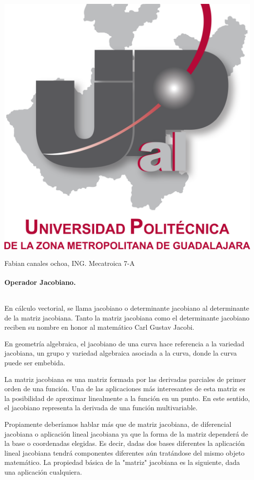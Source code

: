 \documentclass[10pt,a4paper]{article}
\begin{document}
\begin{center}
\includegraphics[scale=0.2]{imagenes/upzmg.png} 
\end{center}
\large \huge Fabian canales ochoa, ING. Mecatroica 7-A \\ \\
\large \huge \textbf{Operador Jacobiano.
} \\ \\
\begin{huge}
En cálculo vectorial, se llama jacobiano o determinante jacobiano al determinante de la matriz jacobiana. Tanto la matriz jacobiana como el determinante jacobiano reciben su nombre en honor al matemático Carl Gustav Jacobi.

En geometría algebraica, el jacobiano de una curva hace referencia a la variedad jacobiana, un grupo y variedad algebraica asociada a la curva, donde la curva puede ser embebida.
\end{huge}
\begin{huge}
La matriz jacobiana es una matriz formada por las derivadas parciales de primer orden de una función. Una de las aplicaciones más interesantes de esta matriz es la posibilidad de aproximar linealmente a la función en un punto. En este sentido, el jacobiano representa la derivada de una función multivariable.

Propiamente deberíamos hablar más que de matriz jacobiana, de diferencial jacobiana o aplicación lineal jacobiana ya que la forma de la matriz dependerá de la base o coordenadas elegidas. Es decir, dadas dos bases diferentes la aplicación lineal jacobiana tendrá componentes diferentes aún tratándose del mismo objeto matemático. La propiedad básica de la "matriz" jacobiana es la siguiente, dada una aplicación cualquiera.
\end{huge}
\end{document}
